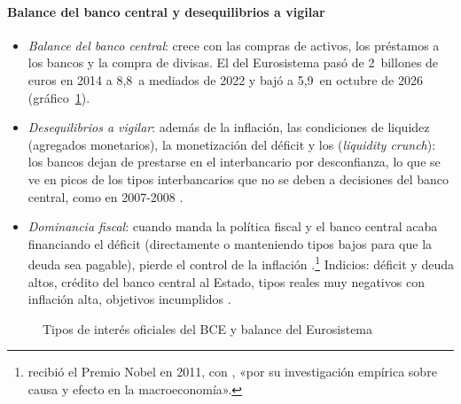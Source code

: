 \documentclass[11pt]{article}
\begin{document}
\paragraph{Balance del banco central y desequilibrios a vigilar}
\begin{itemize}
\item \emph{Balance del banco central}: crece con las compras de activos, los préstamos a los bancos y la compra de divisas. El del Eurosistema pasó de 2~billones de euros en 2014 a 8,8~a mediados de 2022 y bajó a 5,9~en octubre de 2026 \parencite{BCE2026ILM} (gráfico~\ref{fig:tipos-balance-bce}).
\item \emph{Desequilibrios a vigilar}: además de la inflación, las condiciones de liquidez (agregados monetarios), la monetización del déficit y los  (\emph{liquidity crunch}): los bancos dejan de prestarse en el interbancario por desconfianza, lo que se ve en picos de los tipos interbancarios que no se deben a decisiones del banco central, como en 2007-2008 \parencite{TaylorWilliams2009}.
\item \emph{Dominancia fiscal}: cuando manda la política fiscal y el banco central acaba financiando el déficit (directamente o manteniendo tipos bajos para que la deuda sea pagable), pierde el control de la inflación \parencite{SargentWallace1981Some,Leeper1991}.\footnote{ recibió el Premio Nobel en 2011, con , «por su investigación empírica sobre causa y efecto en la macroeconomía»\nocite{Nobel2011SargentSims}.} Indicios: déficit y deuda altos, crédito del banco central al Estado, tipos reales muy negativos con inflación alta, objetivos incumplidos .
\end{itemize}

\begin{figure}[!htb]
\centering
\caption{Tipos de interés oficiales del BCE y balance del Eurosistema}\label{fig:tipos-balance-bce}
\end{figure}
\end{document}
